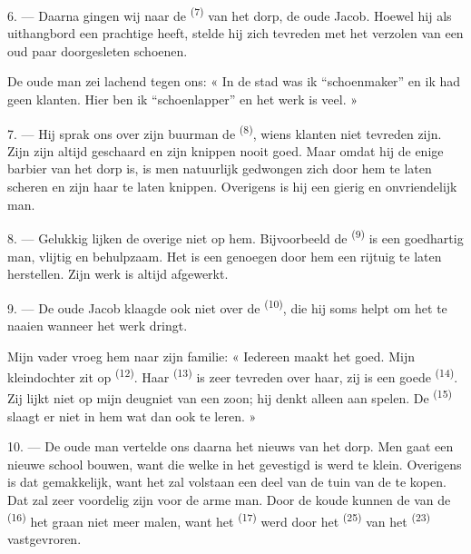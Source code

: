 6. --- Daarna gingen wij naar de  \textsuperscript{(7)} van het dorp, de
oude Jacob. Hoewel hij als uithangbord een prachtige  heeft, stelde hij zich
tevreden met het verzolen van een oud paar doorgesleten schoenen.

De oude man zei lachend tegen ons: « In de stad was ik “schoenmaker” en ik had geen klanten.
Hier ben ik “schoenlapper” en het werk is veel. »

7. --- Hij sprak ons over zijn buurman de  \textsuperscript{(8)}, wiens
klanten niet tevreden zijn. Zijn
 zijn altijd geschaard en zijn  knippen
nooit goed. Maar omdat hij de enige barbier van het dorp is, is men natuurlijk gedwongen zich
door hem te laten scheren en zijn haar te laten knippen. Overigens is hij een gierig en
onvriendelijk man.

8. --- Gelukkig lijken de overige  niet op hem. Bijvoorbeeld de
 \textsuperscript{(9)} is een goedhartig man, vlijtig en
behulpzaam. Het is een genoegen door hem een rijtuig te laten herstellen. Zijn werk is altijd
afgewerkt.

9. --- De oude Jacob klaagde ook niet over de  \textsuperscript{(10)}, die
hij soms helpt om het  te naaien wanneer het werk dringt.

Mijn vader vroeg hem naar zijn familie: « Iedereen maakt het goed. Mijn kleindochter zit op
 \textsuperscript{(12)}. Haar
 \textsuperscript{(13)} is zeer tevreden over haar, zij is
een goede  \textsuperscript{(14)}. Zij lijkt niet op mijn deugniet van een
zoon; hij denkt alleen aan spelen. De  \textsuperscript{(15)} slaagt er
niet in hem wat dan ook te leren. »

\VUsaut{3.0mm}
\VUsaut{3.0mm}

10. --- De oude man vertelde ons daarna het nieuws van het dorp. Men gaat een nieuwe school
bouwen, want die welke in het  gevestigd is werd te klein. Overigens is
dat gemakkelijk, want het zal volstaan een deel van de tuin van de  te kopen.
Dat zal zeer voordelig zijn voor de arme man. Door de koude kunnen de  van
de  \textsuperscript{(16)} het graan niet meer malen, want het 
\textsuperscript{(17)} werd door het  \textsuperscript{(25)} van het
 \textsuperscript{(23)} vastgevroren.


